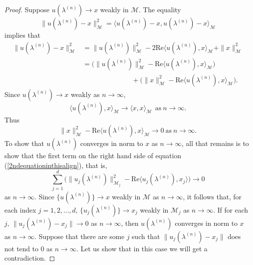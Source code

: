 \documentclass[10pt,a4paper]{amsart}
\begin{document}
\begin{proof} Suppose  $u(\lambda^{(n)})\rightarrow x$ weakly in $\mathcal{M}$.  The equality
$$\|u(\lambda^{(n)})-x\|_{\mathcal{M}}^{2} = \langle u(\lambda^{(n)})-x,u(\lambda^{(n)})-x\rangle_{\mathcal{M}}$$
implies that
\begin{align}
\|u(\lambda^{(n)})-x\|_{\mathcal{M}}^{2}&=\|u(\lambda^{(n)})\|_{\mathcal{M}}^{2}-2\mathrm{Re} \langle u(\lambda^{(n)}),x\rangle_{\mathcal{M}} +\|x\|_{\mathcal{M}}^{2}\nonumber\\
&=\bigg(\|u(\lambda^{(n)})\|_{\mathcal{M}}^{2}-\mathrm{Re} \langle u(\lambda^{(n)}),x\rangle_{\mathcal{M}} \bigg)\nonumber\\
&\hspace{3cm}+\bigg(\|x\|_{\mathcal{M}}^{2}-\mathrm{Re} \langle u(\lambda^{(n)}),x\rangle_{\mathcal{M}} \bigg)\label{2ndequationinthisalign}.
\end{align}
Since $u(\lambda^{(n)})\rightarrow x$ weakly as $n\rightarrow\infty$, 
$$\langle u(\lambda^{(n)}),x \rangle_{\mathcal{M}} \rightarrow \langle x,x\rangle_{\mathcal{M}}~~\text{as}~n\rightarrow \infty.$$
Thus
\begin{equation}\label{equivalenceofweakconvergence}
 \|x\|_{\mathcal{M}}^{2}-\mathrm{Re} \langle u(\lambda^{(n)}),x\rangle_{\mathcal{M}} \rightarrow 0~\text{as}~n\rightarrow \infty.
\end{equation}
To show that $u(\lambda^{(n)})$ converges in norm to $x$ as $n\rightarrow \infty$, all that remains is to show that the first term on the right hand side of equation (\ref{2ndequationinthisalign}), that is, 
\begin{equation}\label{ujtoxj}
\sum_{j=1}^{d}\Big(\|u_{j}(\lambda^{(n)})\|_{\mathcal{M}_{j}}^{2}-\mathrm{Re} \langle u_{j}(\lambda^{(n)}),x_{j}\rangle \Big) \to 0
\end{equation}
as  $n\rightarrow \infty$.
Since $\{u(\lambda^{(n)})\} \to x$ weakly in $\mathcal{M}$ as $n\rightarrow \infty$, it follows that, for each index $j= 1,2, \dots, d$,  $\{u_{j}(\lambda^{(n)})\} \to x_{j}$ weakly in $\mathcal{M}_{j}$ as $n\rightarrow \infty$.
 If for each $j$, $\|u_{j}(\lambda^{(n)}) - x_j\| \to 0$  as $n\rightarrow \infty$, then $u(\lambda^{(n)})$ converges in norm to $x$ as $n\rightarrow \infty$. Suppose that there are some $j$ such that 
$\|u_{j}(\lambda^{(n)}) - x_j\|$ does not tend to $0$  as $n\rightarrow \infty$. Let us show that in this case we will get a contradiction.


\end{proof}
\end{document}
